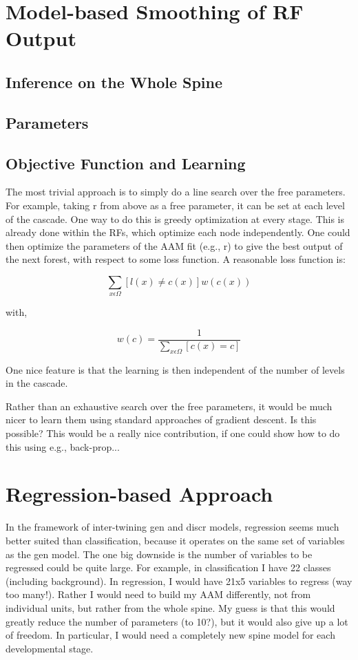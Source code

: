 \section{Model-based Smoothing of RF Output}

\subsection{Inference on the Whole Spine}


\subsection{Parameters}

\subsection{Objective Function and Learning}

The most trivial approach is to simply do a line search over the free parameters. For example, taking r from above as a free parameter, it can be set at each level of the cascade. One way to do this is greedy optimization at every stage.  This is already done within the RFs, which optimize each node independently.  One could then optimize the parameters of the AAM fit (e.g., r) to give the best output of the next forest, with respect to some loss function.  A reasonable loss function is:

\[ \sum_{x \epsilon \Omega} [l(x) \neq c(x)] w(c(x)) \]

with,

\[ w(c) = \frac{1}{\sum_{x \epsilon \Omega} [c(x) = c]} \]

One nice feature is that the learning is then independent of the number of levels in the cascade.

Rather than an exhaustive search over the free parameters, it would be much nicer to learn them using standard approaches of gradient descent.  Is this possible?  This would be a really nice contribution, if one could show how to do this using e.g., back-prop...

\section{Regression-based Approach}

In the framework of inter-twining gen and discr models, regression seems much better suited than classification, because it operates on the same set of variables as the gen model.  The one big downside is the number of variables to be regressed could be quite large.  For example, in classification I have 22 classes (including background).  In regression, I would have 21x5 variables to regress (way too many!).  Rather I would need to build my AAM differently, not from individual units, but rather from the whole spine.  My guess is that this would greatly reduce the number of parameters (to 10?), but it would also give up a lot of freedom.  In particular, I would need a completely new spine model for each developmental stage.

